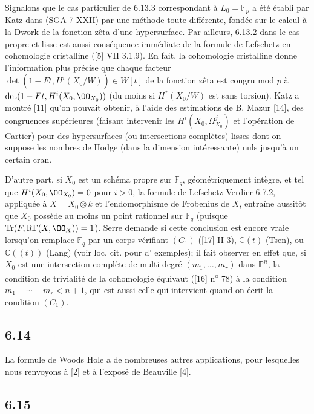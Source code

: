 Signalons que le cas particulier de 6.13.3 correspondant à $L_0=\mathbb{F}_p$ a été établi par Katz dans (SGA 7 XXII) par une méthode toute différente, fondée sur le calcul à la Dwork de la fonction zêta d'une hypersurface. Par ailleurs, 6.13.2 dans le cas propre et lisse est aussi conséquence immédiate de la formule de Lefschetz en cohomologie cristalline ([5] VII 3.1.9). En fait, la cohomologie cristalline donne l'information plus précise que chaque facteur $\det(1-Ft,H^i(X_0/W))\in W[t]$ de la fonction zêta est congru mod $p$ à $\det(1-Ft,H^i(X_0,\OO_{X_0}))$ (du moins si $H^*(X_0/W)$ est sans torsion). Katz a montré [11] qu'on pouvait obtenir, à l'aide des estimations de B. Mazur [14], des congruences supérieures (faisant intervenir les $H^i(X_0,\Omega^j_{X_0})$ et l'opération de Cartier) pour des hypersurfaces (ou intersections complètes) lisses dont on suppose les nombres de Hodge (dans la dimension intéressante) nuls jusqu'à un certain cran.

D'autre part, si $X_0$ est un schéma propre sur $\mathbb{F}_q$, géométriquement intègre, et tel que $H^i(X_0,\OO_{X_0})=0$ pour $i>0$, la formule de Lefschetz-Verdier 6.7.2, appliquée à $X=X_0\otimes k$ et l'endomorphisme de Frobenius de $X$, entraîne aussitôt que $X_0$ possède au moins un point rationnel sur $\mathbb{F}_q$ (puisque $\operatorname{Tr}(F,\mathrm{R}\Gamma(X,\OO_X))=1$). Serre demande si cette conclusion est encore vraie lorsqu'on remplace $\mathbb{F}_q$ par un corps vérifiant $(C_1)$ ([17] II 3),  $\mathbb{C}(t)$ (Tsen), ou $\mathbb{C}((t))$ (Lang) (voir loc. cit. pour d' exemples); il fait observer en effet que, si $X_0$ est une intersection complète de multi-degré $(m_1,\ldots,m_r)$ dans $\mathbb{P}^n$, la condition de trivialité de la cohomologie équivaut ([16] n\textsuperscript{o} 78) à la condition $m_1+\cdots+m_r<n+1$, qui est aussi celle qui intervient quand on écrit la condition $(C_1)$.

\subsection*{6.14}
La
formule de Woods Hole a de nombreuses autres applications, pour lesquelles nous renvoyons à [2] et à l'exposé de Beauville [4].


\subsection*{6.15}

